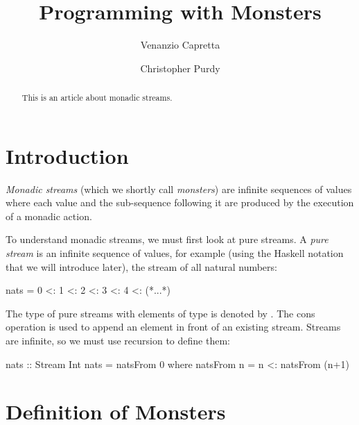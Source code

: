 \documentclass{jfp}
\begin{document}


\totalpg{\pageref{lastpage01}}

\title{Programming with Monsters}

\begin{authgrp}
\author{Venanzio Capretta}
\author{Christopher Purdy}
\end{authgrp}

\begin{abstract}
This is an article about monadic streams.
\end{abstract}

\maketitle

\section{Introduction}

{\em Monadic streams} (which we shortly call {\em monsters}) are infinite sequences of values where each value and the sub-sequence following it are produced by the execution of a monadic action.

To understand monadic streams, we must first look at pure streams.
A \emph{pure stream} is an infinite sequence of values, for example (using the Haskell notation that we will introduce later), the stream of all natural numbers:
\begin{haskell}
  nats = 0 <: 1 <: 2 <: 3 <: 4 <: (*...*)
\end{haskell}
The type of pure streams with elements of type  is denoted by . The cons operation \hcode{(<:)} is used to append an element in front of an existing stream. Streams are infinite, so we must use recursion to define them:
\begin{haskell}
nats :: Stream Int
nats = natsFrom 0 where
  natsFrom n = n <: natsFrom (n+1)
\end{haskell}

\section{Definition of Monsters}
\end{document}
